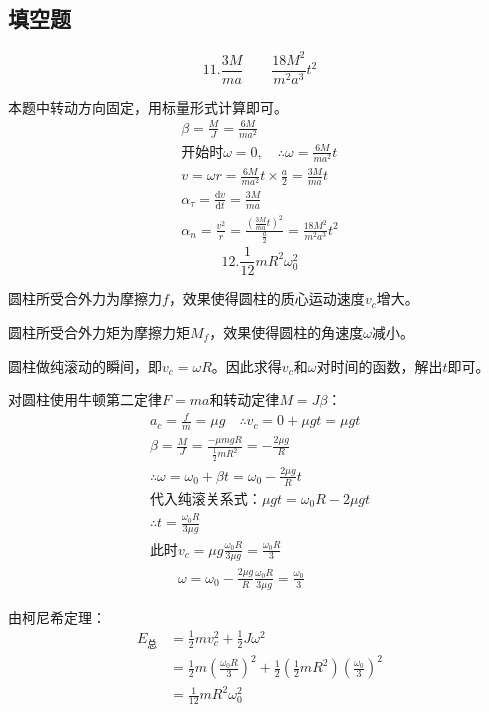 \documentclass[blue, pad]{./templete/qyxfnote}
\newcommand{\di}[1]{\mathrm{d}#1}
\newcommand{\dy}[2]{\frac{\di{#1}}{\di{#2}}}
\begin{document}
	\subsection{填空题}
			\[11.\frac{3M}{ma} \hspace{2em} \frac{18M^2}{m^2a^3}t^2\]\par
			本题中转动方向固定，用标量形式计算即可。
			\begin{gather*}
			\beta=\frac{M}{J}=\frac{6M}{ma^2}\\
			\text{开始时}\omega=0,\quad\therefore \omega=\frac{6M}{ma^2}t\\
			v=\omega r=\frac{6M}{ma^2}t\times\frac{a}{2}=\frac{3M}{ma}t\\
			\alpha_{\tau}=\dy{v}{t}=\frac{3M}{ma}\\
			\alpha_n=\frac{v^2}{r}=\frac{\left(\frac{3M}{ma}t\right)^2}{\frac{a}{2}}=\frac{18M^2}{m^2a^3}t^2
			\end{gather*}
			\[12.\frac{1}{12}mR^2\omega_0^2\]\par
			圆柱所受合外力为摩擦力$f$，效果使得圆柱的质心运动速度$ v_c $增大。\par
			圆柱所受合外力矩为摩擦力矩$ M_f $，效果使得圆柱的角速度$ \omega $减小。\par
			圆柱做纯滚动的瞬间，即$ v_c=\omega R $。因此求得$ v_c $和$ \omega $对时间的函数，解出$ t $即可。\par
			对圆柱使用牛顿第二定律$F=ma$和转动定律$M=J\beta$：
			\begin{gather*}
			a_c=\frac{f}{m}=\mu g\quad\therefore v_c=0+\mu gt=\mu gt\\
			\beta=\frac{M}{J}=\frac{-\mu mgR}{\frac{1}{2}mR^2}=-\frac{2\mu g}{R}\\
			\therefore \omega=\omega_0+\beta t=\omega_0-\frac{2\mu g}{R}t\\
			\text{代入纯滚关系式：}\mu gt=\omega_0R-2\mu gt\\
			\therefore t=\frac{\omega_0R}{3\mu g}\\
			\text{此时}v_c=\mu g\frac{\omega_0R}{3\mu g}=\frac{\omega_0R}{3}\\
			\hspace{2em}\omega=\omega_0-\frac{2\mu g}{R}\frac{\omega_0R}{3\mu g}=\frac{\omega_0}{3}
			\end{gather*}\par
			由柯尼希定理：
			\begin{align*}
			E_{\text{总}}&=\frac{1}{2}mv_c^2+\frac{1}{2}J\omega^2\\
			&=\frac{1}{2}m\left(\frac{\omega_0R}{3}\right)^2+\frac{1}{2}\left(\frac{1}{2}mR^2\right)\left(\frac{\omega_0}{3}\right)^2\\
			&=\frac{1}{12}mR^2\omega_0^2
			\end{align*}
\end{document}
